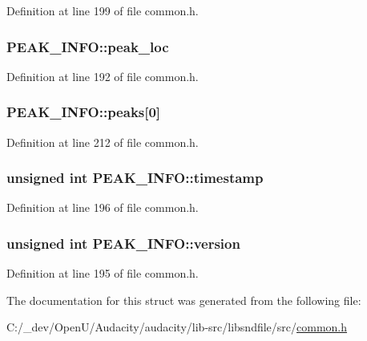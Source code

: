 Definition at line 199 of file common.\+h.

\subsubsection[{\texorpdfstring{peak\+\_\+loc}{peak_loc}}]{ P\+E\+A\+K\+\_\+\+I\+N\+F\+O\+::peak\+\_\+loc}\hypertarget{struct_p_e_a_k___i_n_f_o_acf3d1e8f36f0547534f7424142f16759}{}\label{struct_p_e_a_k___i_n_f_o_acf3d1e8f36f0547534f7424142f16759}


Definition at line 192 of file common.\+h.

\subsubsection[{\texorpdfstring{peaks}{peaks}}]{ P\+E\+A\+K\+\_\+\+I\+N\+F\+O\+::peaks\mbox{[}0\mbox{]}}\hypertarget{struct_p_e_a_k___i_n_f_o_ac2da4c4fd001aea42bb50b493b8a6e7e}{}\label{struct_p_e_a_k___i_n_f_o_ac2da4c4fd001aea42bb50b493b8a6e7e}


Definition at line 212 of file common.\+h.

\subsubsection[{\texorpdfstring{timestamp}{timestamp}}]{\setlength{\rightskip}{0pt plus 5cm}unsigned {\bf int} P\+E\+A\+K\+\_\+\+I\+N\+F\+O\+::timestamp}\hypertarget{struct_p_e_a_k___i_n_f_o_ace12bab485583fd1d10fb6eb6ed42324}{}\label{struct_p_e_a_k___i_n_f_o_ace12bab485583fd1d10fb6eb6ed42324}


Definition at line 196 of file common.\+h.

\subsubsection[{\texorpdfstring{version}{version}}]{\setlength{\rightskip}{0pt plus 5cm}unsigned {\bf int} P\+E\+A\+K\+\_\+\+I\+N\+F\+O\+::version}\hypertarget{struct_p_e_a_k___i_n_f_o_a541af59eb790d3e0e91fecb9f7be753a}{}\label{struct_p_e_a_k___i_n_f_o_a541af59eb790d3e0e91fecb9f7be753a}


Definition at line 195 of file common.\+h.



The documentation for this struct was generated from the following file\+:\begin{DoxyCompactItemize}
\item 
C\+:/\+\_\+dev/\+Open\+U/\+Audacity/audacity/lib-\/src/libsndfile/src/\hyperlink{libsndfile_2src_2common_8h}{common.\+h}\end{DoxyCompactItemize}
